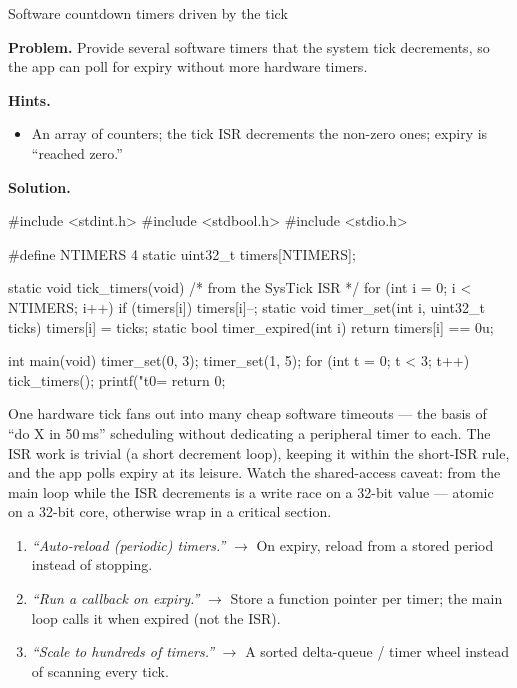 \begin{gymproblem}{Software countdown timers driven by the tick}

\textbf{Problem.} Provide several software timers that the system tick
decrements, so the app can poll for expiry without more hardware timers.

\textbf{Hints.}
\begin{itemize}
\item An array of counters; the tick ISR decrements the non-zero ones; expiry
  is ``reached zero.''
\end{itemize}

\attempt

\textbf{Solution.}
\begin{cgym}
#include <stdint.h>
#include <stdbool.h>
#include <stdio.h>

#define NTIMERS 4
static uint32_t timers[NTIMERS];

static void tick_timers(void) {                 /* from the SysTick ISR */
    for (int i = 0; i < NTIMERS; i++)
        if (timers[i]) timers[i]--;
}
static void timer_set(int i, uint32_t ticks) { timers[i] = ticks; }
static bool timer_expired(int i) { return timers[i] == 0u; }

int main(void) {
    timer_set(0, 3); timer_set(1, 5);
    for (int t = 0; t < 3; t++) tick_timers();
    printf("t0=%
    return 0;
}
\end{cgym}

One hardware tick fans out into many cheap software timeouts --- the basis of
``do X in 50\,ms'' scheduling without dedicating a peripheral timer to each. The
ISR work is trivial (a short decrement loop), keeping it within the
short-ISR rule, and the app polls expiry at its leisure. Watch the shared-access
caveat:  from the main loop while the ISR decrements is a write
race on a 32-bit value --- atomic on a 32-bit core, otherwise wrap in a
critical section.

\followups
\begin{enumerate}
\item \emph{``Auto-reload (periodic) timers.''} $\rightarrow$ On expiry, reload
  from a stored period instead of stopping.
\item \emph{``Run a callback on expiry.''} $\rightarrow$ Store a function
  pointer per timer; the main loop calls it when expired (not the ISR).
\item \emph{``Scale to hundreds of timers.''} $\rightarrow$ A sorted
  delta-queue / timer wheel instead of scanning every tick.
\end{enumerate}
\end{gymproblem}

